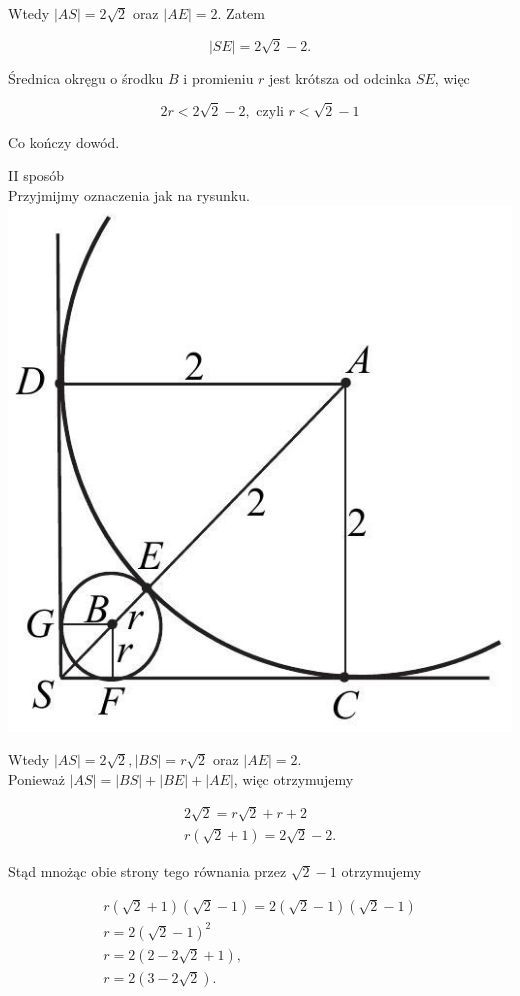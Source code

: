 \documentclass[10pt]{article}
\begin{document}
Wtedy $|A S|=2 \sqrt{2}$ oraz $|A E|=2$. Zatem

$$
|S E|=2 \sqrt{2}-2 .
$$

Średnica okręgu o środku $B$ i promieniu $r$ jest krótsza od odcinka $S E$, więc

$$
2 r<2 \sqrt{2}-2, \text { czyli } r<\sqrt{2}-1
$$

Co kończy dowód.

II sposób\\
Przyjmijmy oznaczenia jak na rysunku.\\
\includegraphics[max width=\textwidth, center]{2025_02_07_a74eed68a1a2147a06fdg-10(1)}

Wtedy $|A S|=2 \sqrt{2},|B S|=r \sqrt{2}$ oraz $|A E|=2$.\\
Ponieważ $|A S|=|B S|+|B E|+|A E|$, więc otrzymujemy

$$
\begin{gathered}
2 \sqrt{2}=r \sqrt{2}+r+2 \\
r(\sqrt{2}+1)=2 \sqrt{2}-2 .
\end{gathered}
$$

Stąd mnożąc obie strony tego równania przez $\sqrt{2}-1$ otrzymujemy

$$
\begin{gathered}
r(\sqrt{2}+1)(\sqrt{2}-1)=2(\sqrt{2}-1)(\sqrt{2}-1) \\
r=2(\sqrt{2}-1)^{2} \\
r=2(2-2 \sqrt{2}+1), \\
r=2(3-2 \sqrt{2}) .
\end{gathered}
$$
\end{document}
